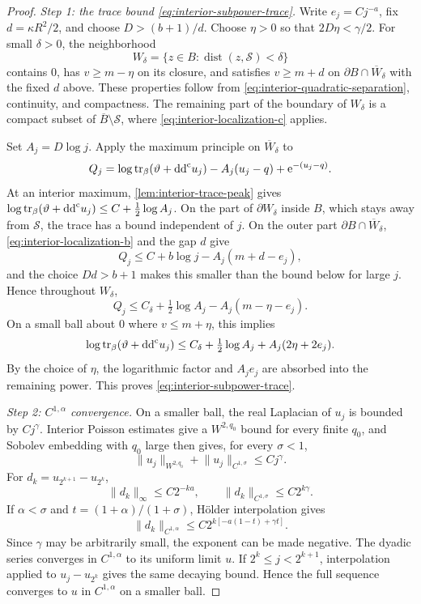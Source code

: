 \begin{proof}
\emph{Step 1: the trace bound \eqref{eq:interior-subpower-trace}.} Write $e_j=Cj^{-a}$, fix $d=\kappa R^2/2$, and choose $D>(b+1)/d$. Choose $\eta>0$ so that $2D\eta<\gamma/2$. For small $\delta>0$, the neighborhood
\[
  W_\delta=\{z\in B:\operatorname{dist}(z,\mathcal S)<\delta\}
\]
contains $0$, has $v\geq m-\eta$ on its closure, and satisfies $v\geq m+d$ on $\partial B\cap\overline W_\delta$ with the fixed $d$ above. These properties follow from \eqref{eq:interior-quadratic-separation}, continuity, and compactness. The remaining part of the boundary of $W_\delta$ is a compact subset of $\overline B\setminus\mathcal S$, where \eqref{eq:interior-localization-c} applies.

Set $A_j=D\log j$. Apply the maximum principle on $\overline W_\delta$ to
\[
  Q_j=\log\operatorname{tr}_\beta(\vartheta+\mathrm{dd}^{\mathrm{c}} u_j)-A_j(u_j-q)+\mathrm{e}^{-(u_j-q)}.
\]
At an interior maximum, \cref{lem:interior-trace-peak} gives $\log\operatorname{tr}_\beta(\vartheta+\mathrm{dd}^{\mathrm{c}} u_j)\leq C+\frac12\log A_j$. On the part of $\partial W_\delta$ inside $B$, which stays away from $\mathcal S$, the trace has a bound independent of $j$. On the outer part $\partial B\cap\overline W_\delta$, \eqref{eq:interior-localization-b} and the gap $d$ give
\[
  Q_j\leq C+b\log j-A_j(m+d-e_j),
\]
and the choice $Dd>b+1$ makes this smaller than the bound below for large $j$. Hence throughout $W_\delta$,
\[
  Q_j\leq C_\delta+\tfrac12\log A_j-A_j(m-\eta-e_j).
\]
On a small ball about $0$ where $v\leq m+\eta$, this implies
\[
  \log\operatorname{tr}_\beta(\vartheta+\mathrm{dd}^{\mathrm{c}} u_j)
  \leq C_\delta+\tfrac12\log A_j+A_j(2\eta+2e_j).
\]
By the choice of $\eta$, the logarithmic factor and $A_je_j$ are absorbed into the remaining power. This proves \eqref{eq:interior-subpower-trace}.

\emph{Step 2: $C^{1,\alpha}$ convergence.} On a smaller ball, the real Laplacian of $u_j$ is bounded by $Cj^\gamma$. Interior Poisson estimates give a $W^{2,q_0}$ bound for every finite $q_0$, and Sobolev embedding with $q_0$ large then gives, for every $\sigma<1$,
\[
  \lVert u_j\rVert_{W^{2,q_0}}+\lVert u_j\rVert_{C^{1,\sigma}}
  \leq Cj^\gamma.
\]
For $d_k=u_{2^{k+1}}-u_{2^k}$,
\[
  \lVert d_k\rVert_\infty\leq C2^{-ka},
  \qquad
  \lVert d_k\rVert_{C^{1,\sigma}}\leq C2^{k\gamma}.
\]
If $\alpha<\sigma$ and $t=(1+\alpha)/(1+\sigma)$, H\"older interpolation gives
\[
  \lVert d_k\rVert_{C^{1,\alpha}}
  \leq C2^{k[-a(1-t)+\gamma t]}.
\]
Since $\gamma$ may be arbitrarily small, the exponent can be made negative. The dyadic series converges in $C^{1,\alpha}$ to its uniform limit $u$. If $2^k\leq j<2^{k+1}$, interpolation applied to $u_j-u_{2^k}$ gives the same decaying bound. Hence the full sequence converges to $u$ in $C^{1,\alpha}$ on a smaller ball.
\end{proof}


